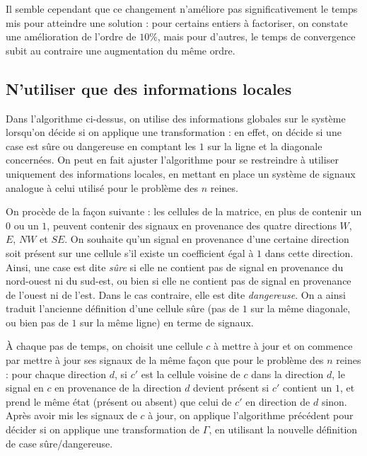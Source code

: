 \documentclass[11pt, openany]{article}
\begin{document}
Il semble cependant que ce changement n'améliore pas significativement le temps mis pour atteindre une solution : pour certains entiers à factoriser, on constate une amélioration de l'ordre de $10\%$, mais pour d'autres, le temps de convergence subit au contraire une augmentation du même ordre.   


\subsection*{N'utiliser que des informations locales}

Dans l'algorithme ci-dessus, on utilise des informations globales sur le système lorsqu'on décide si on applique une transformation : en effet, on décide si une case est sûre ou dangereuse en comptant les $1$ sur la ligne et la diagonale concernées. On peut en fait ajuster l'algorithme pour se restreindre à utiliser uniquement des informations locales, en mettant en place un système de signaux analogue à celui utilisé pour le problème des $n$ reines. 

On procède de la façon suivante : les cellules de la matrice, en plus de contenir un $0$ ou un $1$, peuvent contenir des signaux en provenance des quatre directions $W$, $E$, $NW$ et $SE$. On souhaite qu'un signal en provenance d'une certaine direction soit présent sur une cellule s'il existe un coefficient égal à $1$ dans cette direction. Ainsi, une case est dite \emph{sûre} si elle ne contient pas de signal en provenance du nord-ouest ni du sud-est, ou bien si elle ne contient pas de signal en provenance de l'ouest ni de l'est. Dans le cas contraire, elle est dite \emph{dangereuse}. On a ainsi traduit l'ancienne définition d'une cellule sûre (pas de $1$ sur la même diagonale, ou bien pas de $1$ sur la même ligne) en terme de signaux.

À chaque pas de temps, on choisit une cellule $c$ à mettre à jour et on commence par mettre à jour ses signaux de la même façon que pour le problème des $n$ reines : pour chaque direction $d$, si $c'$ est la cellule voisine de $c$ dans la direction $d$, le signal en $c$ en provenance de la direction $d$ devient présent si $c'$ contient un $1$, et prend le même état (présent ou absent) que celui de $c'$ en direction de $d$ sinon.
Après avoir mis les signaux de $c$ à jour, on applique l'algorithme précédent pour décider si on applique une transformation de $\Gamma$, en utilisant la nouvelle définition de case sûre/dangereuse. 
\end{document}
